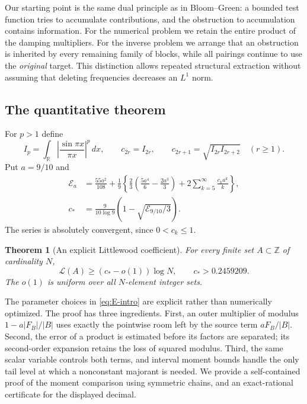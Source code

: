 \documentclass[11pt,reqno]{amsart}
\numberwithin{equation}{section}
\newtheorem{theorem}{Theorem}[section]
\theoremstyle{definition}
\theoremstyle{remark}
\newcommand{\Z}{\mathbb Z}
\newcommand{\R}{\mathbb R}
\newcommand{\La}{\mathcal L}
\begin{document}
Our starting point is the same dual principle as in Bloom--Green: a
bounded test function tries to accumulate contributions, and the
obstruction to accumulation contains information. For the numerical
problem we retain the entire product of the damping multipliers. For the
inverse problem we arrange that an obstruction is inherited by every
remaining family of blocks, while all pairings continue to use the
\emph{original} target. This distinction allows repeated structural
extraction without assuming that deleting frequencies decreases an
$L^1$ norm.

\subsection{The quantitative theorem}

For $p>1$ define
\begin{equation}\label{eq:sinc-intro}
 I_p=\int_{\R}\left|\frac{\sin\pi x}{\pi x}\right|^p\,dx,
 \qquad c_{2r}=I_{2r},\qquad
 c_{2r+1}=\sqrt{I_{2r}I_{2r+2}}\quad(r\ge1).
\end{equation}
Put $a=9/10$ and
\begin{align}
 \mathcal E_a&=\frac{55a^2}{108}
 +\frac19\left\{
 \frac23\left(\frac{5a^4}{6}-\frac{2a^3}{3}\right)
 +2\sum_{k=5}^{\infty}\frac{c_ka^k}{k}\right\},
 \label{eq:E-intro}\\
 c_*&=\frac{9}{10\log9}\left(1-\sqrt{\mathcal E_{9/10}/3}\right).
 \label{eq:cstar}
\end{align}
The series is absolutely convergent, since $0<c_k\le1$.

\begin{theorem}[An explicit Littlewood coefficient]\label{thm:constant}
For every finite set $A\subset\Z$ of cardinality $N$,
\begin{equation}\label{eq:constant-result}
 \La(A)\ge(c_*-o(1))\log N,
 \qquad c_*>0.2459209.
\end{equation}
The $o(1)$ is uniform over all $N$-element integer sets.
\end{theorem}

The parameter choices in \eqref{eq:E-intro} are explicit rather than
numerically optimized. The proof has three ingredients. First, an outer
multiplier of modulus $1-a|F_B|/|B|$ uses exactly the pointwise room left
by the source term $aF_B/|B|$. Second, the error of a product is estimated
before its factors are separated; its second-order expansion retains the
loss of squared modulus. Third, the same scalar variable controls both
terms, and interval moment bounds handle the only tail level at which a
nonconstant majorant is needed. We provide a self-contained proof of the
moment comparison using symmetric chains, and an exact-rational
certificate for the displayed decimal.
\end{document}
